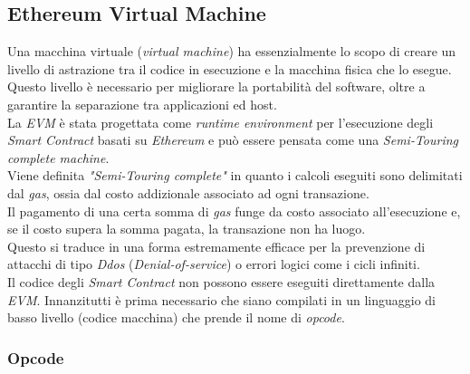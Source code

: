 \documentclass[11pt]{thesistemp}
\begin{document}
\subsection{Ethereum Virtual Machine}

Una macchina virtuale (\textit{virtual machine}) ha essenzialmente lo scopo di creare un livello di astrazione tra il codice in esecuzione e la macchina fisica che lo esegue.\\
Questo livello è necessario per migliorare la portabilità del software, oltre a garantire la separazione tra applicazioni ed host.\\
La \textit{EVM} è stata progettata come \textit{runtime environment} per l'esecuzione degli \textit{Smart Contract} basati su \textit{Ethereum} e può essere pensata come una \textit{Semi-Touring complete machine}.\\
Viene definita \textit{"Semi-Touring complete"} in quanto i calcoli eseguiti sono delimitati dal \textit{gas}, ossia dal costo addizionale associato ad ogni transazione.\\
Il pagamento di una certa somma di \textit{gas} funge da costo associato all'esecuzione e, se il costo supera la somma pagata, la transazione non ha luogo.\\
Questo si traduce in una forma estremamente efficace per la prevenzione di attacchi di tipo \textit{Ddos} (\textit{Denial-of-service}) o errori logici come i cicli infiniti.\\
Il codice degli \textit{Smart Contract} non possono essere eseguiti direttamente dalla \textit{EVM}.
Innanzitutti è prima necessario che siano compilati in un linguaggio di basso livello (codice macchina) che prende il nome di \textit{opcode}.

\subsubsection{Opcode}
\end{document}
